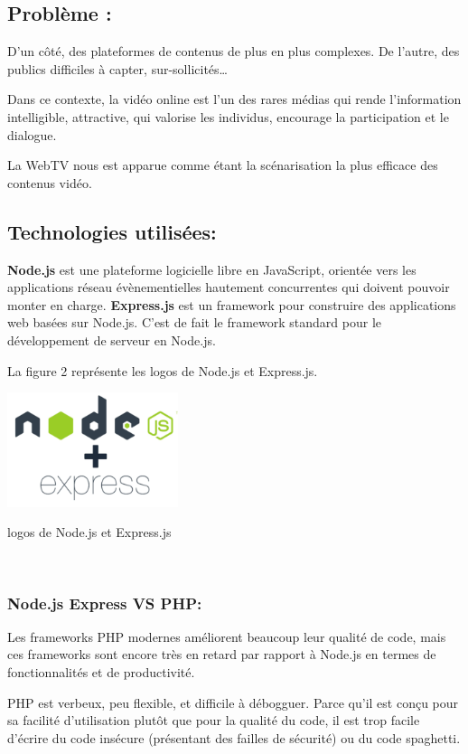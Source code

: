 \subsection{Problème :}
D’un côté, des plateformes de contenus de plus en plus complexes. De l’autre, des publics difficiles à capter, sur-sollicités…\par
Dans ce contexte, la vidéo online est l’un des rares médias qui rende l’information intelligible, attractive, qui valorise les individus, encourage la participation et le dialogue.\par
La WebTV nous est apparue comme étant la scénarisation la plus efficace des contenus vidéo.\par
\subsection{Technologies utilisées:}
\textbf{Node.js} est une plateforme logicielle libre en JavaScript, orientée vers les applications réseau évènementielles hautement concurrentes qui doivent pouvoir monter en charge.
\textbf{Express.js} est un framework pour construire des applications web basées sur Node.js. C'est de fait le framework standard pour le développement de serveur en Node.js.\par
La figure 2 représente les logos de Node.js et Express.js.\par
\begin{center}
\includegraphics[width=5cm]{images/nodeexpress.png}
     \caption{logos de Node.js et Express.js}
     \label{fig:my_label}\\
\end{center}
\subsubsection{\textbf{Node.js Express VS PHP:}}
Les frameworks PHP modernes améliorent beaucoup leur qualité de code, mais ces frameworks sont encore très en retard par rapport à Node.js en termes de fonctionnalités et de productivité.\par
 PHP est verbeux, peu flexible, et difficile à débogguer. Parce qu'il est conçu pour sa facilité d'utilisation plutôt que pour la qualité du code, il est trop facile d'écrire du code insécure (présentant des failles de sécurité) ou du code spaghetti.\par
